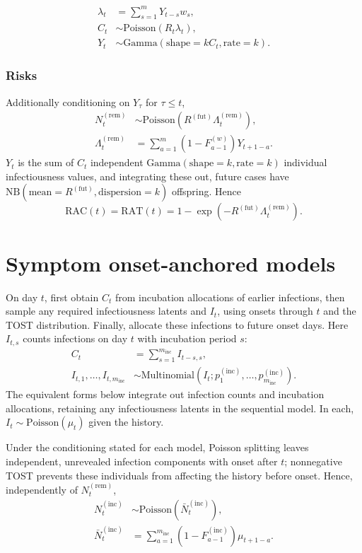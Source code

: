 \documentclass{article}
\newcommand{\PoissonDist}[1]{\mathrm{Poisson}\left(#1\right)}
\newcommand{\NBDist}[2]{\mathrm{NB}\left(\mathrm{mean}=#1,
\mathrm{dispersion}=#2\right)}
\newcommand{\GammaDist}[2]{\mathrm{Gamma}\left(\mathrm{shape}=#1,
\mathrm{rate}=#2\right)}
\newcommand{\MultinomialDist}[2]{\mathrm{Multinomial}\left(#1; #2\right)}
\newcommand{\incPMF}{p^{(\mathrm{inc})}}
\newcommand{\incCDF}{F^{(\mathrm{inc})}}
\newcommand{\Rfut}{R^{(\mathrm{fut})}}
\newcommand{\RAC}{\mathrm{RAC}}
\newcommand{\RAT}{\mathrm{RAT}}
\begin{document}
\begin{align}
  \lambda_{t} &= \sum_{s=1}^{m} Y_{t-s} w_s,\\
  C_t &\sim \PoissonDist{R_{t}\lambda_{t}},\\
  Y_t &\sim \GammaDist{kC_t}{k}.
\end{align}

\subsubsection{Risks}

Additionally conditioning on \(Y_\tau\) for \(\tau\leq t\),
\begin{align}
  N^{(\mathrm{rem})}_{t} &\sim \PoissonDist{\Rfut\Lambda^{(\mathrm{rem})}_{t}},\\
  \Lambda^{(\mathrm{rem})}_{t} &= \sum_{a=1}^{m} (1-F_{a-1}^{(w)})Y_{t+1-a}.
\end{align}
\(Y_t\) is the sum of \(C_t\) independent \(\GammaDist{k}{k}\) individual
infectiousness values, and integrating these out, future cases have
\(\NBDist{\Rfut}{k}\) offspring. Hence
\begin{equation}
  \RAC(t)=\RAT(t)=1-\exp(-\Rfut\Lambda^{(\mathrm{rem})}_{t}).
\end{equation}

\section{Symptom onset-anchored models}

On day \(t\), first obtain \(C_t\) from incubation allocations of earlier
infections, then sample any required infectiousness latents and \(I_t\),
using onsets through \(t\) and the TOST distribution. Finally, allocate
these infections to future onset days. Here \(I_{t,s}\) counts infections
on day \(t\) with incubation period \(s\):
\begin{align}
  C_t &= \sum_{s=1}^{m_{\mathrm{inc}}} I_{t-s,s},\\
  I_{t,1}, \ldots, I_{t,m_{\mathrm{inc}}} &\sim
  \MultinomialDist{I_t}{\incPMF_{1},
  \ldots, \incPMF_{m_{\mathrm{inc}}}}.
\end{align}
The equivalent forms below integrate out infection counts and incubation
allocations, retaining any infectiousness latents in the sequential model.
In each, \(I_t\sim\PoissonDist{\mu_t}\) given the history.

Under the conditioning stated for each model, Poisson splitting leaves
independent, unrevealed infection components with onset after \(t\);
nonnegative TOST prevents these individuals from affecting the history
before onset. Hence, independently of \(N_t^{(\mathrm{rem})}\),
\begin{align}
  N^{(\mathrm{inc})}_{t} &\sim \PoissonDist{\bar N_t^{(\mathrm{inc})}},\\
  \bar N_t^{(\mathrm{inc})} &= \sum_{a=1}^{m_{\mathrm{inc}}}
  (1-\incCDF_{a-1})\mu_{t+1-a}.
\end{align}
\end{document}
